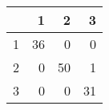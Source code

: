 \begin{tabular}{rrrr}
  \hline
 & 1 & 2 & 3 \\ 
  \hline
1 &  36 &   0 &   0 \\ 
  2 &   0 &  50 &   1 \\ 
  3 &   0 &   0 &  31 \\ 
   \hline
\end{tabular}

